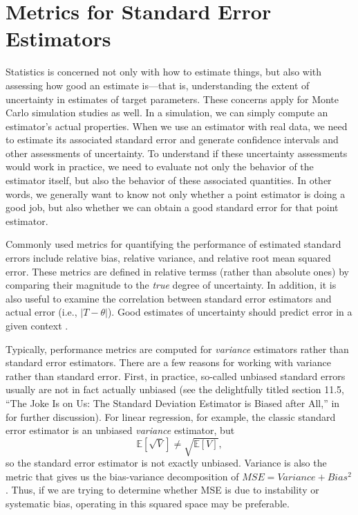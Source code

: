 \documentclass[
]{book}
\newcommand{\E}{\mathbb{E}}
\begin{document}
\section{Metrics for Standard Error Estimators}\label{metrics-for-standard-error-estimators}

Statistics is concerned not only with how to estimate things, but also with assessing how good an estimate is---that is, understanding the extent of uncertainty in estimates of target parameters.
These concerns apply for Monte Carlo simulation studies as well.
In a simulation, we can simply compute an estimator's actual properties.
When we use an estimator with real data, we need to estimate its associated standard error and generate confidence intervals and other assessments of uncertainty.
To understand if these uncertainty assessments would work in practice, we need to evaluate not only the behavior of the estimator itself, but also the behavior of these associated quantities.
In other words, we generally want to know not only whether a point estimator is doing a good job, but also whether we can obtain a good standard error for that point estimator.

Commonly used metrics for quantifying the performance of estimated standard errors include relative bias, relative variance, and relative root mean squared error.
These metrics are defined in relative termss (rather than absolute ones) by comparing their magnitude to the \emph{true} degree of uncertainty.
In addition, it is also useful to examine the correlation between standard error estimators and actual error (i.e., \(\left|T - \theta \right|\)).
Good estimates of uncertainty should predict error in a given context \citep[especially if calculating conditional estimates; see][]{sundberg2003conditional}.

Typically, performance metrics are computed for \emph{variance} estimators rather than standard error estimators.
There are a few reasons for working with variance rather than standard error.
First, in practice, so-called unbiased standard errors usually are not in fact actually unbiased (see the delightfully titled section 11.5, ``The Joke Is on Us: The Standard Deviation Estimator is Biased after All,'' in \citet{westfall2013understanding} for further discussion).
For linear regression, for example, the classic standard error estimator is an unbiased \emph{variance} estimator, but
\[ 
\E[ \sqrt{ V } ] \neq \sqrt{ \E[ V ] },
\]
so the standard error estimator is not exactly unbiased.
Variance is also the metric that gives us the bias-variance decomposition of \(MSE = Variance + Bias^2\). Thus, if we are trying to determine whether MSE is due to instability or systematic bias, operating in this squared space may be preferable.
\end{document}
